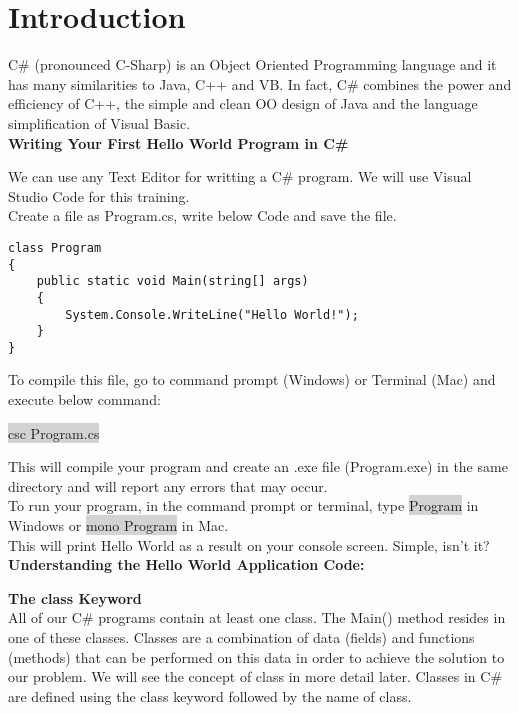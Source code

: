 \chapter{Introduction}

C\# (pronounced C-Sharp) is an Object Oriented Programming language and it has many similarities to Java, C++ and VB. In fact, C\#
combines the power and efficiency of C++, the simple and clean OO design of Java and the language simplification of Visual Basic.\\

\textbf{Writing Your First Hello World Program in C\#}

We can use any Text Editor for writting a C\# program. We will use Visual Studio Code for this training.\\

Create a file as Program.cs, write below Code and save the file.

\begin{lstlisting}
class Program
{
    public static void Main(string[] args)
    {
        System.Console.WriteLine("Hello World!");
    }
}
\end{lstlisting}

To compile this file, go to command prompt (Windows) or Terminal (Mac) and execute below command:


\colorbox{lightgray}{csc Program.cs}


This will compile your program and create an .exe file (Program.exe) in the same directory and will
report any errors that may occur.\\

To run your program, in the command prompt or terminal, type \colorbox{lightgray}{Program} in Windows or \colorbox{lightgray}{mono Program} in Mac.\\

This will print Hello World as a result on your console screen. Simple, isn’t it?\\


\textbf{Understanding the Hello World Application Code:}


\textbf{The class Keyword}\\
All of our C\# programs contain at least one class. The Main() method resides in one of these classes. Classes are a
combination of data (fields) and functions (methods) that can be performed on this data in order to achieve the
solution to our problem. We will see the concept of class in more detail later. Classes in C\# are
defined using the class keyword followed by the name of class.\\

